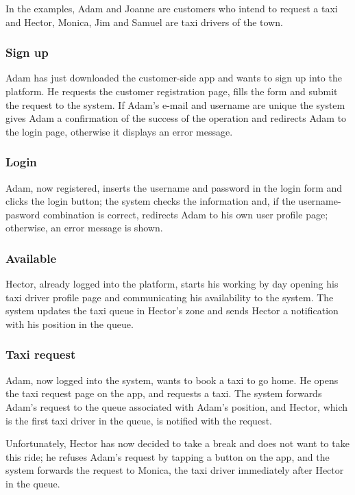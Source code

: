 \documentclass[english]{article}
\begin{document}
In the examples, Adam and Joanne are customers who intend to request
a taxi and Hector, Monica, Jim and Samuel are taxi drivers of the
town. 


\subsubsection{Sign up}

Adam has just downloaded the customer-side app and wants to sign up
into the platform. He requests the customer registration page, fills
the form and submit the request to the system. If Adam's e-mail and
username are unique the system gives Adam a confirmation of the success
of the operation and redirects Adam to the login page, otherwise it
displays an error message.


\subsubsection{Login}

Adam, now registered, inserts the username and password in the login
form and clicks the login button; the system checks the information
and, if the username-pasword combination is correct, redirects Adam
to his own user profile page; otherwise, an error message is shown. 


\subsubsection{Available}

Hector, already logged into the platform, starts his working by day
opening his taxi driver profile page and communicating his availability
to the system. The system updates the taxi queue in Hector's zone
and sends Hector a notification with his position in the queue. 


\subsubsection{Taxi request}

Adam, now logged into the system, wants to book a taxi to go home.
He opens the taxi request page on the app, and requests a taxi. The
system forwards Adam's request to the queue associated with Adam's
position, and Hector, which is the first taxi driver in the queue,
is notified with the request. 

Unfortunately, Hector has now decided to take a break and does not
want to take this ride; he refuses Adam's request by tapping a button
on the app, and the system forwards the request to Monica, the taxi
driver immediately after Hector in the queue. 
\end{document}
